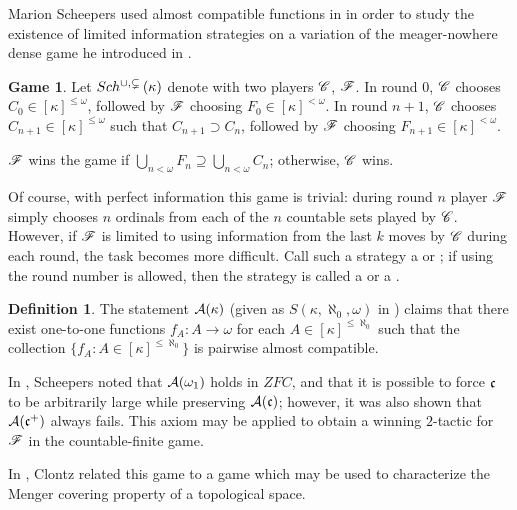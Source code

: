 \documentclass{rmmcart}
\theoremstyle{plain}
\theoremstyle{definition}
\newtheorem{definition}[theorem]{Definition}
\newtheorem{game}[theorem]{Game}
\theoremstyle{remark}
\theoremstyle{plain}
\theoremstyle{definition}
\theoremstyle{remark}
\begin{document}
  Marion Scheepers used almost compatible functions in \cite{MR1129143} in order
  to study the existence of limited information strategies on a variation
  of the meager-nowhere dense game he introduced in \cite{MR1183703}.

  \begin{game}
    Let \(Sch^{\cup,\subsetneq}\left({\kappa}\right)\) denote
    with two players \(\mathscr{C}\), \(\mathscr{F}\). In round \(0\), \(\mathscr{C}\) chooses
    \(C_0\in[\kappa]^{\leq\omega}\), followed by \(\mathscr{F}\) choosing
    \(F_0\in[\kappa]^{<\omega}\). In round \(n+1\), \(\mathscr{C}\) chooses
    \(C_{n+1}\in[\kappa]^{\leq\omega}\) such that \(C_{n+1}\supset C_n\), followed
    by \(\mathscr{F}\) choosing \(F_{n+1}\in[\kappa]^{<\omega}\).

    \(\mathscr{F}\) wins the game if
    \(\bigcup_{n<\omega} F_n\supseteq\bigcup_{n<\omega} C_n\); otherwise,
    \(\mathscr{C}\) wins.
  \end{game}

  Of course, with perfect information this game is trivial: during round
  \(n\) player \(\mathscr{F}\) simply chooses \(n\) ordinals from each of the
  \(n\) countable sets played by \(\mathscr{C}\). However, if \(\mathscr{F}\) is limited
  to using information from the last \(k\) moves by \(\mathscr{C}\) during each
  round, the task becomes more difficult. Call such a strategy a
   or ; if using the round
  number is allowed, then the strategy is called a 
  or a .

  \begin{definition}
    The statement \(\mathcal{A}(\kappa)\) (given as \(S(\kappa,\aleph_0,\omega)\)
    in \cite{MR1129143})
    claims that there exist one-to-one functions
    \(f_A:A\to\omega\) for each \(A\in[\kappa]^{\leq\aleph_0}\) such that
    the collection \(\{f_A:A\in[\kappa]^{\leq\aleph_0}\}\) is pairwise
    almost compatible.
  \end{definition}

  In \cite{MR1129143}, Scheepers noted that \(\mathcal{A}(\omega_1)\) holds in \(ZFC\),
  and that it is possible to force \(\mathfrak{c}\) to be arbitrarily large
  while preserving \(\mathcal{A}(\mathfrak{c})\); however,
  it was also shown that \(\mathcal{A}(\mathfrak{c}^+)\) always fails.
  This axiom may be applied to obtain a winning \(2\)-tactic for \(\mathscr{F}\)
  in the countable-finite game.

  In \cite{clontzMengerGamePreprint}, Clontz related this game to a game
  which may be used to characterize the Menger covering property of a
  topological space.
\end{document}
